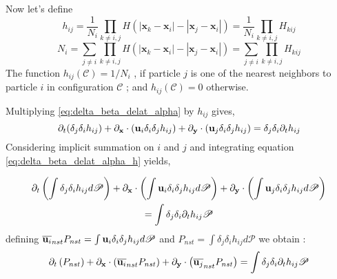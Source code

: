 Now let's define 
\begin{equation*}
    h_{ij} 
    = \frac{1}{N_i}
    \prod_{k \neq i,j}
    H(|\textbf{x}_k - \textbf{x}_i| - |\textbf{x}_j - \textbf{x}_i|)
    = \frac{1}{N_i}
    \prod_{k \neq i,j}
    H_{kij}
\end{equation*}
\begin{equation*}
    N_i
    = 
    \sum_{j\neq i}
    \prod_{k \neq i,j}
    H(|\textbf{x}_k - \textbf{x}_i| - |\textbf{x}_j - \textbf{x}_i|)
    = 
    \sum_{j\neq i}
    \prod_{k \neq i,j}
    H_{kij}
\end{equation*}
The function $h_{ij} (\mathscr{C}) = 1/N_i$ , if particle $j$ is one
of the nearest neighbors to particle $i$ in configuration $\mathscr{C}$ ;
and $h_{ij} (\mathscr{C} ) = 0$ otherwise.

Multiplying \ref{eq:delta_beta_delat_alpha} by $h_{ij}$ gives, 
\begin{equation}
    \partial_t (\delta_j\delta_i h_{ij}) + \partial_\textbf{x} \cdot (\textbf{u}_i \delta_i\delta_j h_{ij}) + \partial_\textbf{y} \cdot (\textbf{u}_j \delta_i\delta_j h_{ij}) = \delta_j\delta_i\partial_t h_{ij}
    \label{eq:delta_beta_delat_alpha_h}
\end{equation}
Considering implicit summation on $i$ and $j$ and integrating equation \ref{eq:delta_beta_delat_alpha_h}  yields, 

\begin{multline}
    \partial_t \left(\int \delta_j\delta_i h_{ij} d\mathscr{P} \right) 
    + \partial_\textbf{x} \cdot \left(\int\textbf{u}_i \delta_i\delta_j h_{ij} d\mathscr{P} \right) 
    + \partial_\textbf{y} \cdot \left( \int \textbf{u}_j \delta_i\delta_j h_{ij} d\mathscr{P} \right) 
    \\=\int \delta_j\delta_i\partial_t h_{ij} \mathscr{P}
\end{multline}
defining $\overline{\textbf{u}_i}_{nst} P_{nst}= \int\textbf{u}_i \delta_i\delta_j h_{ij} d\mathscr{P} $ and $P_{nst} = \int \delta_j\delta_i h_{ij} d\mathscr{P} $ we obtain :
\begin{equation}
    \partial_t \left(P_{nst} \right) 
    + \partial_\textbf{x} \cdot \left(\overline{\textbf{u}_i}_{nst} P_{nst}\right) 
    + \partial_\textbf{y} \cdot \left( \overline{\textbf{u}_j}_{nst} P_{nst} \right) 
    =\int \delta_j\delta_i\partial_t h_{ij} \mathscr{P}
\end{equation}


